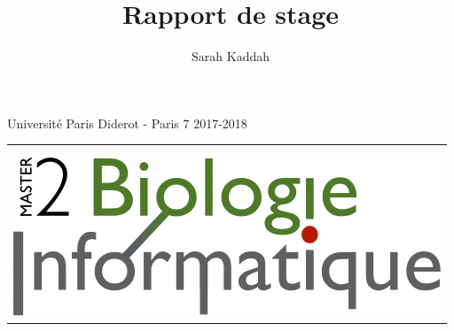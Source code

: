 \documentclass[12pt,a4paper]{article}
\author{Sarah Kaddah}
\title{Rapport de stage}
\begin{document}
\begin{titlepage}
  \begin{sffamily}
  \begin{center}
	\large{Université Paris Diderot - Paris 7 \hfill 2017-2018} \bigskip
	
\begin{tabular}{c}
\\ \\ \\
\includegraphics[scale=0.3]{img/m2.png}
\end{tabular}
\hfill
\begin{tabular}{c}
\\

\end{tabular}
\end{center}
\end{sffamily}
\end{titlepage}
\end{document}
